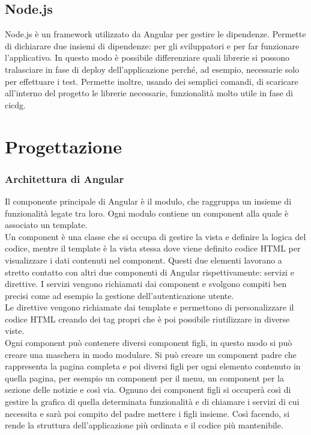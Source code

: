 \subsection*{Node.js}
Node.js è un framework utilizzato da Angular per gestire le dipendenze. Permette
di dichiarare due insiemi di dipendenze: per gli sviluppatori e per far funzionare
l’applicativo. In questo modo è possibile differenziare quali librerie si possono tralasciare in fase di deploy dell’applicazione perché, ad esempio, necessarie solo per effettuare i test. Permette inoltre, usando dei semplici comandi, di scaricare all’interno del progetto le librerie necessarie, funzionalità molto utile in fase di \gls{cicdg}.\cite{site:node}

\section{Progettazione}
\label{sec:progettazione}

\subsubsection{Architettura di Angular}
Il componente principale di Angular è il modulo, che raggruppa un insieme di funzionalità legate tra loro. Ogni modulo contiene un component alla quale è associato un template.\\
Un component è una classe che si occupa di gestire la vista e definire la logica del codice, mentre il template è la vista stessa dove viene definito codice HTML per visualizzare i dati contenuti nel component. Questi due elementi lavorano a stretto contatto con altri due componenti di Angular rispettivamente: servizi e direttive.
I servizi vengono richiamati dai component e svolgono compiti ben precisi come ad esempio la gestione dell’autenticazione utente.\\
Le direttive vengono richiamate dai template e permettono di personalizzare il codice HTML creando dei tag propri che è poi possibile riutilizzare in diverse viste.\\
Ogni component può contenere diversi component figli, in questo modo si può creare una maschera in modo modulare. Si può creare un component padre che rappresenta la pagina completa e poi diversi figli per ogni elemento contenuto in quella pagina,
per esempio un component per il menu, un component per la sezione delle notizie e così via. Ognuno dei component figli si occuperà così di gestire la grafica di quella determinata funzionalità e di chiamare i servizi di cui necessita e sarà poi compito del
padre mettere i figli insieme. Così facendo, si rende la struttura dell’applicazione più ordinata e il codice più mantenibile.

